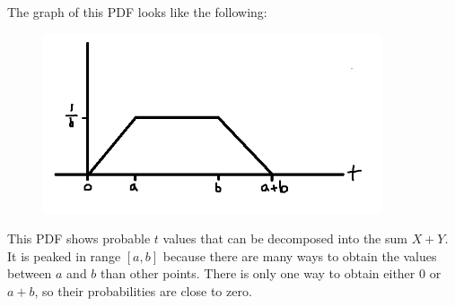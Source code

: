 \documentclass[12pt, a4paper]{article}
\newcounter{exa}
\begin{document}
\begin{texample}
The graph of this PDF looks like the following:

\begin{figure}[H]
\centering
\includegraphics[width=100mm]{28.png}
\end{figure}

This PDF shows probable $t$ values that can be decomposed into the sum $X+Y$. It is peaked in range $[a,b]$ because there are many ways to obtain the values between $a$ and $b$ than other points. There is only one way to obtain either $0$ or $a+b$, so their probabilities are close to zero.
\end{texample}
\end{document}
